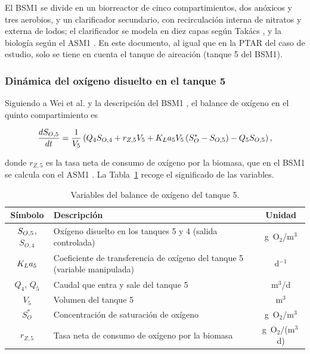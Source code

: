 El BSM1 se divide en un biorreactor de cinco compartimientos, dos anóxicos y tres aerobios, y un
clarificador secundario, con recirculación interna de nitratos y externa de lodos; el clarificador se
modela en diez capas según Takács \cite{takacs1991settler}, y la biología según el ASM1
\cite{henze1987asm1}. En este documento, al igual que en la PTAR del caso de estudio, solo se tiene en
cuenta el tanque de aireación (tanque 5 del BSM1).

\subsubsection*{Dinámica del oxígeno disuelto en el tanque 5}

Siguiendo a Wei et al. \cite{wei2020disturbance} y la descripción del BSM1
\cite{alex2008bsm1}, el balance de oxígeno en el quinto compartimiento es

\begin{equation}
    \frac{dS_{O,5}}{dt} = \frac{1}{V_{5}}
    \left( Q_{4}S_{O,4} + r_{Z,5}V_5 + K_{L}a_{5} V_{5}\,(S_{O}^{*} - S_{O,5})
    - Q_{5}S_{O,5} \right),
    \label{eq:intro_do}
\end{equation}

donde $r_{Z,5}$ es la tasa neta de consumo de oxígeno por la biomasa, que en el BSM1 se calcula con
el ASM1 \cite{henze1987asm1}. La Tabla~\ref{tab:intro_variables} recoge el significado de las
variables.

\begin{table}[H]
\centering
\caption{Variables del balance de oxígeno del tanque 5.}
\label{tab:intro_variables}
\renewcommand{\arraystretch}{1.25}
\small
\begin{tabular}{|c|p{8.6cm}|c|}
\hline
\rowcolor[gray]{0.9}
\textbf{Símbolo} & \textbf{Descripción} & \textbf{Unidad} \\ \hline
$S_{O,5}$, $S_{O,4}$ & Oxígeno disuelto en los tanques 5 y 4 (salida controlada) & g~O$_2$/m$^3$ \\ \hline
$K_{L}a_{5}$ & Coeficiente de transferencia de oxígeno del tanque 5 (variable manipulada) & d$^{-1}$ \\ \hline
$Q_4$, $Q_5$ & Caudal que entra y sale del tanque 5 & m$^3$/d \\ \hline
$V_5$ & Volumen del tanque 5 & m$^3$ \\ \hline
$S_O^{*}$ & Concentración de saturación de oxígeno & g~O$_2$/m$^3$ \\ \hline
$r_{Z,5}$ & Tasa neta de consumo de oxígeno por la biomasa & g~O$_2$/(m$^3$\,d) \\ \hline
\end{tabular}
\end{table}

